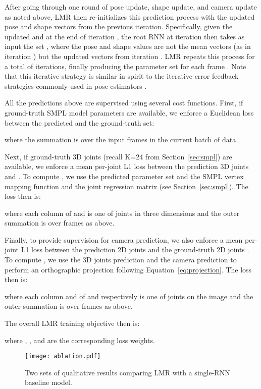 \documentclass[10pt,twocolumn,letterpaper]{article}
\begin{document}
After going through one round of pose update, shape update, and camera update as noted above, LMR then re-initializes this prediction process with the updated pose and shape vectors from the previous iteration. Specifically, given the updated  and  at the end of iteration , the root RNN at iteration  then takes as input the set , where the pose and shape values are not the mean vectors (as in iteration ) but the updated vectors from iteration . LMR repeats this process for a total of  iterations, finally producing the parameter set  for each frame . Note that this iterative strategy is similar in spirit to the iterative error feedback strategies commonly used in pose estimators \cite{dollar2010cascaded,oberweger2015training,carreira2016human,hmrKanazawa17}.

All the predictions above are supervised using several cost functions. First, if ground-truth SMPL model parameters  are available, we enforce a Euclidean loss between the predicted and the ground-truth set:

where the summation is over the  input frames in the current batch of data. 

Next, if ground-truth 3D joints  (recall K=24 from Section~\ref{sec:smpl}) are available, we enforce a mean per-joint L1 loss between the prediction 3D joints  and . To compute , we use the predicted parameter set  and the SMPL vertex mapping function  and the joint regression matrix  (see Section~\ref{sec:smpl}). The loss then is:


where each column of  and  is one of  joints in three dimensions and the outer summation is over  frames as above.


Finally, to provide supervision for camera prediction, we also enforce a mean per-joint L1 loss between the prediction 2D joints  and the ground-truth 2D joints . To compute , we use the 3D joints prediction  and the camera prediction  to perform an orthographic projection following Equation~\ref{eq:projection}. The loss then is:


where each column  and  of  and  respectively is one of  joints on the image and the outer summation is over  frames as above.

The overall LMR training objective then is:


where , , and  are the corresponding loss weights.


\begin{figure*}[h!]
\centering
\texttt{[image: ablation.pdf]}
\caption{Two sets of qualitative results comparing LMR with a single-RNN baseline model.}
\label{fig:qua_w_ablation}
\end{figure*}
\end{document}
